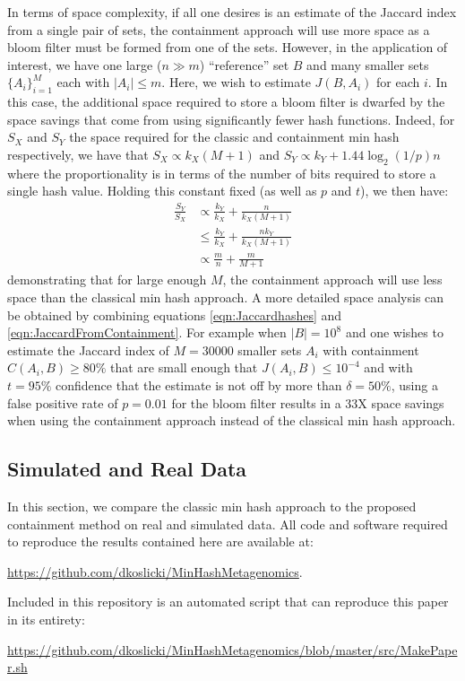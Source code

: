 \documentclass[11pt,reqno]{amsart}
\theoremstyle{remark}
\numberwithin{equation}{section}
\newcommand{\classicX}{X}
\newcommand{\containX}{Y}
\begin{document}
In terms of space complexity, if all one desires is an estimate of the Jaccard index from a single pair of sets, the containment approach will use more space as a bloom filter must be formed from one of the sets. However, in the application of interest, we have one large ($n\gg m$) ``reference'' set $B$ and many smaller sets $\{A_i\}_{i=1}^M$ each with $|A_i|\leq m$. Here, we wish to estimate $J(B,A_i)$ for each $i$. In this case, the additional space required to store a bloom filter is dwarfed by the space savings that come from using significantly fewer hash functions. Indeed, for $S_\classicX$ and $S_\containX$ the space required for the classic and containment min hash respectively, we have that $S_\classicX \propto k_\classicX (M+1)$ and $S_\containX \propto k_\containX + 1.44 \log_2(1/p)n$ where the proportionality is in terms of the number of bits required to store a single hash value. Holding this constant fixed (as well as $p$ and $t$), we then have:
\begin{align}
\label{eqn:size}
\frac{S_\containX}{S_\classicX} &\propto \frac{k_\containX}{k_\classicX} +\frac{n}{k_\classicX (M+1)}\\
&\leq \frac{k_\containX}{k_\classicX} +\frac{nk_\containX}{k_\classicX (M+1)}\\
&\propto \frac{m}{n}+\frac{m}{M+1}
\end{align}
demonstrating that for large enough $M$, the containment approach will use less space than the classical min hash approach. A more detailed space analysis can be obtained by combining equations \eqref{eqn:Jaccardhashes} and \eqref{eqn:JaccardFromContainment}. For example when $|B|=10^8$ and one wishes to estimate the Jaccard index of $M=30000$ smaller sets $A_i$ with containment $C(A_i,B)\geq 80\%$ that are small enough that $J(A_i,B)\leq 10^{-4}$ and with $t=95\%$ confidence that the estimate is not off by more than $\delta=50\%$, using a false positive rate of $p=0.01$ for the bloom filter results in a 33X space savings when using the containment approach instead of the classical min hash approach.



\subsection{Simulated and Real Data}
In this section, we compare the classic min hash approach to the proposed containment method on real and simulated data. All code and software required to reproduce the results contained here are available at:
\begin{center}
 \url{https://github.com/dkoslicki/MinHashMetagenomics}.
\end{center}
Included in this repository is an automated script that can reproduce this paper in its entirety:
\begin{center}
\url{https://github.com/dkoslicki/MinHashMetagenomics/blob/master/src/MakePaper.sh}
\end{center}
\end{document}
